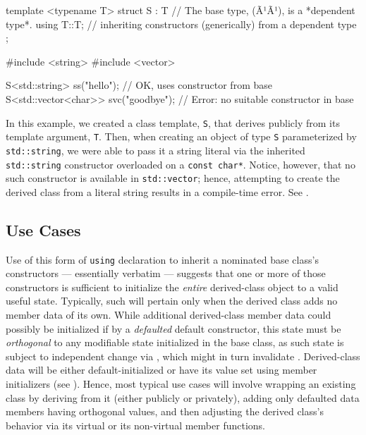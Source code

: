 \begin{emcppslisting}[language=C++]
template <typename T>
struct S : T  // The base type, (Ã¹{}Ã¹), is a *dependent type*.
{
    using T::T;  // inheriting constructors (generically) from a dependent type
};

#include <string>
#include <vector>

S<std::string>        ss("hello");    // OK, uses constructor from base
S<std::vector<char>> svc("goodbye");  // Error: no suitable constructor in base
\end{emcppslisting}
    
\noindent In this example, we created a class template, \lstinline!S!, that
derives publicly from its template argument, \lstinline!T!. Then, when
creating an object of type \lstinline!S! parameterized by
\lstinline!std::string!, we were able to pass it a string literal via
the inherited \lstinline!std::string! constructor overloaded on a
\lstinline!const!~\lstinline!char*!. Notice, however, that no such constructor
is available in \lstinline!std::vector!; hence, attempting to create the
derived class from a literal string results in a compile-time error. See . 

\subsection[Use Cases]{Use Cases}\label{use-cases-ctorinheriting}
\label{abstract-use-case}

Use of this form of \lstinline!using! declaration to inherit a nominated
base class's constructors --- essentially verbatim --- suggests that one
or more of those constructors is sufficient to initialize the
\emph{entire} derived-class object to a valid useful state. Typically,
such will pertain only when the derived class adds no member data of its
own. While additional derived-class member data could possibly
be initialized if by a \emph{defaulted} default constructor, this state must be \emph{orthogonal} to
any modifiable state initialized in the base class, as such state is
subject to independent change via , which might in turn
invalidate . Derived-class data will be either default-initialized or have its value set using member
initializers (see ).  
Hence, most typical use cases will involve wrapping an
existing class by deriving from it (either publicly or privately),
adding only defaulted data members having orthogonal values, and then
adjusting the derived class's behavior via  its virtual
or  its non-virtual member functions.

